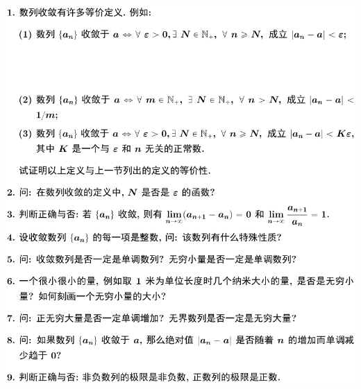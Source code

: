 \documentclass[11pt,a4paper]{ctexart}
\begin{document}
\setlength{\columnsep}{2.2em}
\setlength{\columnseprule}{0.618pt}
\begin{paracol}{2}








\normalsize






\includegraphics[width=\linewidth]{figure01.png}
\newpage
{}


\end{paracol}
\end{document}
